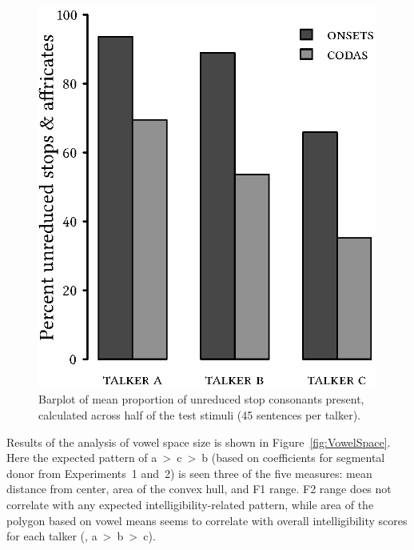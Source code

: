 \begin{figure}
	\begin{centering}
	\includegraphics{figures/posthocs/ReleaseBursts.eps}
	\caption[Barplot of mean proportion of unreduced stop consonants]{Barplot of mean proportion of unreduced stop consonants present, calculated across half of the test stimuli (45 sentences per talker).\label{fig:ReleaseBursts}}
	\end{centering}
\end{figure}

Results of the \ph{} analysis of vowel space size is shown in Figure~\ref{fig:VowelSpace}.  Here the expected pattern of \ac{a}~>~\ac{c}~>~\ac{b} (based on coefficients for segmental donor from Experiments~1 and~2) is seen three of the five measures: mean distance from center, area of the convex hull, and F1 range.  F2 range does not correlate with any expected intelligibility-related pattern, while area of the polygon based on vowel means seems to correlate with overall intelligibility scores for each talker (\ie, \ac{a}~>~\ac{b}~>~\ac{c}).  


